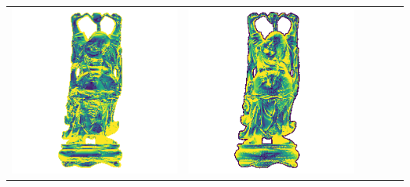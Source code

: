 \begin{center}
\begin{tabularx}{\linewidth}{@{}Y@{}Y@{}Y@{}Y@{}Y@{}Y@{}}
\includegraphics[width=\linewidth]{semisynthetic/20160617_20_yu_err.png} &
\includegraphics[width=\linewidth]{semisynthetic/20160617_20_dpsn_err.png} &

\end{tabularx}
\end{center}
